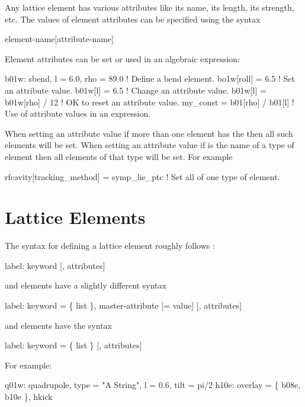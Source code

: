 Any lattice element has various attributes like its name, its length,
its strength, etc. The values of element attributes can be specified using
the syntax
\begin{example}
  element-name[attribute-name]
\end{example}
Element attributes can be set or used in an algebraic expression:
\begin{example}
  b01w: sbend, l = 6.0, rho = 89.0   ! Define a bend element.
  bo1w[roll] = 6.5                   ! Set an attribute value.
  b01w[l] = 6.5                      ! Change an attribute value.
  b01w[l] = b01w[rho] / 12           ! OK to reset an attribute value.
  my_const = b01[rho] / b01[l]       ! Use of attribute values in an expression.
\end{example}
When setting an attribute value if more than one element has the
 then all such elements will be set.  When setting an
attribute value if  is the name of a type of element
then all elements of that type will be set. For example
\begin{example}
  rfcavity[tracking_method] = symp_lie_ptc ! Set all of one type of element.
\end{example}


\section{Lattice Elements}

The syntax for defining a lattice element roughly follows \MAD:
\begin{example}
  label: keyword [, attributes]
\end{example}
 and  elements have a slightly different syntax
\begin{example}
  label: keyword = \{ list \}, master-attribute [= value] [, attributes]
\end{example}
and  elements have the syntax
\begin{example}
  label: keyword = \{ list \} [, attributes]
\end{example}  
For example:
\begin{example}
  q01w: quadrupole, type = "A String", l = 0.6, tilt = pi/2
  h10e: overlay = \{ b08e, b10e \}, hkick
\end{example}
